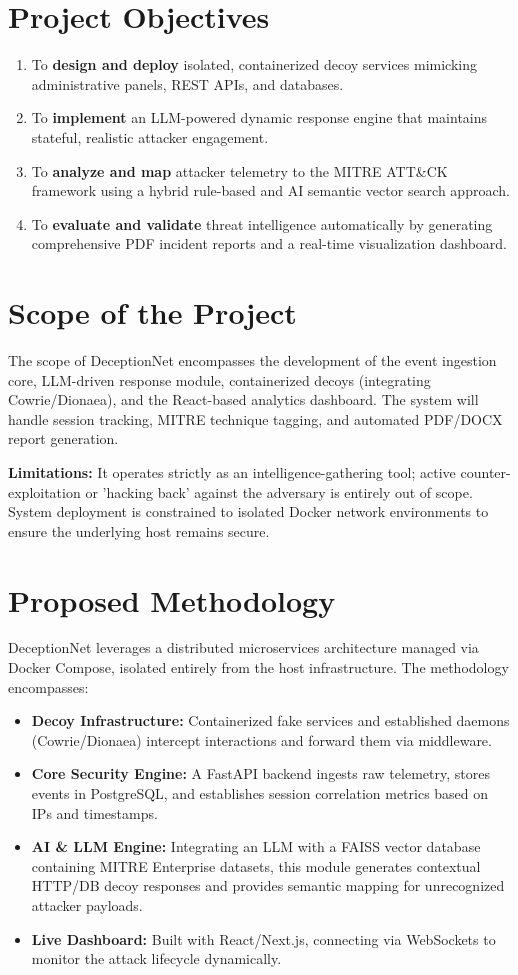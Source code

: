 \documentclass[12pt,a4paper]{report}
\begin{document}
\section{Project Objectives}
\begin{enumerate}
    \item To \textbf{design and deploy} isolated, containerized decoy services mimicking administrative panels, REST APIs, and databases.
    \item To \textbf{implement} an LLM-powered dynamic response engine that maintains stateful, realistic attacker engagement.
    \item To \textbf{analyze and map} attacker telemetry to the MITRE ATT\&CK framework using a hybrid rule-based and AI semantic vector search approach.
    \item To \textbf{evaluate and validate} threat intelligence automatically by generating comprehensive PDF incident reports and a real-time visualization dashboard.
\end{enumerate}

\section{Scope of the Project}
The scope of DeceptionNet encompasses the development of the event ingestion core, LLM-driven response module, containerized decoys (integrating Cowrie/Dionaea), and the React-based analytics dashboard. The system will handle session tracking, MITRE technique tagging, and automated PDF/DOCX report generation. 

\textbf{Limitations:} It operates strictly as an intelligence-gathering tool; active counter-exploitation or 'hacking back' against the adversary is entirely out of scope. System deployment is constrained to isolated Docker network environments to ensure the underlying host remains secure.

\section{Proposed Methodology}
DeceptionNet leverages a distributed microservices architecture managed via Docker Compose, isolated entirely from the host infrastructure. The methodology encompasses:
\begin{itemize}
    \item \textbf{Decoy Infrastructure:} Containerized fake services and established daemons (Cowrie/Dionaea) intercept interactions and forward them via middleware.
    \item \textbf{Core Security Engine:} A FastAPI backend ingests raw telemetry, stores events in PostgreSQL, and establishes session correlation metrics based on IPs and timestamps.
    \item \textbf{AI \& LLM Engine:} Integrating an LLM with a FAISS vector database containing MITRE Enterprise datasets, this module generates contextual HTTP/DB decoy responses and provides semantic mapping for unrecognized attacker payloads.
    \item \textbf{Live Dashboard:} Built with React/Next.js, connecting via WebSockets to monitor the attack lifecycle dynamically.
\end{itemize}
\end{document}
